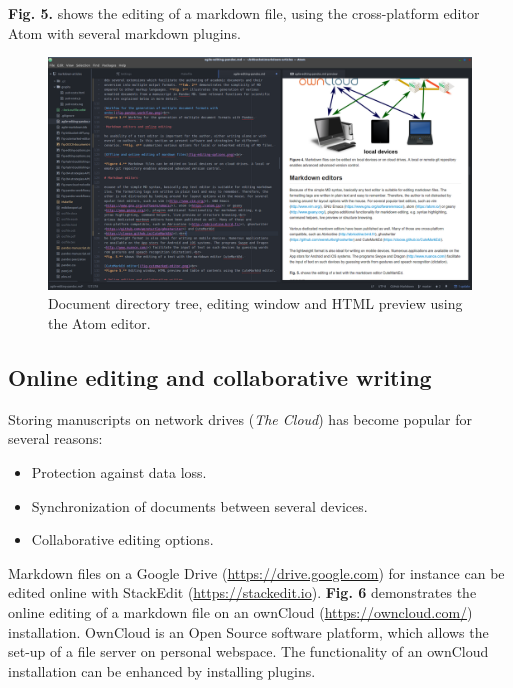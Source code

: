 \documentclass[10pt,fleqn]{wlpeerj}
\providecommand{\tightlist}{%
  \setlength{\itemsep}{0pt}\setlength{\parskip}{0pt}}
\begin{document}
\textbf{Fig. 5.} shows the editing of a markdown file, using the
cross-platform editor Atom with several markdown plugins.

\begin{figure}[htbp]
\centering
\includegraphics{fig-atom-editor.png}
\caption{Document directory tree, editing window and HTML preview using
the Atom editor.}
\end{figure}

\subsection{Online editing and collaborative
writing}\label{online-editing-and-collaborative-writing}

Storing manuscripts on network drives (\emph{The Cloud}) has become
popular for several reasons:

\begin{itemize}
\tightlist
\item
  Protection against data loss.
\item
  Synchronization of documents between several devices.
\item
  Collaborative editing options.
\end{itemize}

Markdown files on a Google Drive (\url{https://drive.google.com}) for
instance can be edited online with StackEdit
(\url{https://stackedit.io}). \textbf{Fig. 6} demonstrates the online
editing of a markdown file on an ownCloud (\url{https://owncloud.com/})
installation. OwnCloud is an Open Source software platform, which allows
the set-up of a file server on personal webspace. The functionality of
an ownCloud installation can be enhanced by installing plugins.
\end{document}

